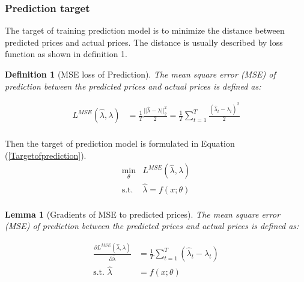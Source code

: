 \documentclass[journal]{IEEEtran}
\newtheorem{definition}{Definition}
\newtheorem{lemma}{Lemma}
\begin{document}
\subsubsection{Prediction target}
The target of training prediction model is to minimize the distance between predicted prices and actual prices. The distance is usually described by loss function as shown in definition 1.

\begin{definition}[MSE loss of Prediction]
  The mean square error (MSE) of prediction between the predicted prices and actual prices is defined as:  
\end{definition}
\begin{equation}
  \label{MSE}
  \begin{aligned}
    L^{MSE}(\hat{\lambda}, \lambda) &= \frac{1}{T} \frac{||\hat{\lambda} - \lambda ||^2_2}{2}  = \frac{1}{T} \sum_{t=1}^T \frac{(\hat{\lambda}_t - \lambda_t)^2}{2} \\
  \end{aligned}
\end{equation}

Then the target of prediction model is formulated in Equation (\ref{Targetofprediction}).
\begin{equation}
  \label{Targetofprediction}
  \begin{aligned}
    \min_{\theta} &L^{MSE}(\hat{\lambda}, \lambda) \\
    \text{s.t. } &\hat{\lambda} = f(x; \theta) \\
  \end{aligned}
\end{equation}

\begin{lemma}[Gradients of MSE to predicted prices]
  The mean square error (MSE) of prediction between the predicted prices and actual prices is defined as:
\end{lemma}
\begin{equation}
  \label{gradientsofMSE}
  \begin{aligned}
    \frac{\partial L^{MSE}(\hat{\lambda}, \lambda)}{\partial \hat{\lambda}} &= \frac{1}{T} \sum_{t=1}^T (\hat{\lambda}_t - \lambda_t) \\
    \text{s.t. } \hat{\lambda} &= f(x; \theta) \\
  \end{aligned}
\end{equation}
\end{document}
